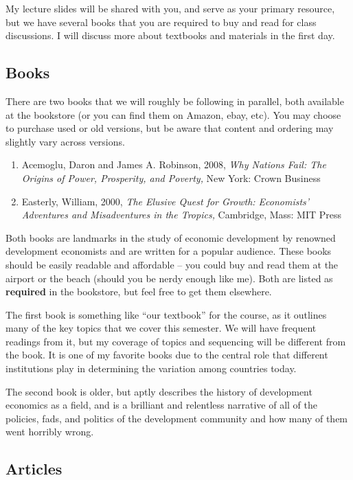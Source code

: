 \documentclass{article}
\providecommand{\tightlist}{%
  \setlength{\itemsep}{0pt}\setlength{\parskip}{0pt}}
\begin{document}
My lecture slides will be shared with you, and serve as your primary
resource, but we have several books that you are required to buy and
read for class discussions. I will discuss more about textbooks and
materials in the first day.

\hypertarget{books}{%
\subsection{Books}\label{books}}

There are two books that we will roughly be following in parallel, both
available at the bookstore (or you can find them on Amazon, ebay, etc).
You may choose to purchase used or old versions, but be aware that
content and ordering may slightly vary across versions.

\begin{enumerate}
\def\labelenumi{\arabic{enumi}.}
\tightlist
\item
  Acemoglu, Daron and James A. Robinson, 2008, \emph{Why Nations Fail:
  The Origins of Power, Prosperity, and Poverty,} New York: Crown
  Business
\item
  Easterly, William, 2000, \emph{The Elusive Quest for Growth:
  Economists' Adventures and Misadventures in the Tropics,} Cambridge,
  Mass: MIT Press
\end{enumerate}

Both books are landmarks in the study of economic development by
renowned development economists and are written for a popular audience.
These books should be easily readable and affordable -- you could buy
and read them at the airport or the beach (should you be nerdy enough
like me). Both are listed as \textbf{required} in the bookstore, but
feel free to get them elsewhere.

The first book is something like ``our textbook'' for the course, as it
outlines many of the key topics that we cover this semester. We will
have frequent readings from it, but my coverage of topics and sequencing
will be different from the book. It is one of my favorite books due to
the central role that different institutions play in determining the
variation among countries today.

The second book is older, but aptly describes the history of development
economics as a field, and is a brilliant and relentless narrative of all
of the policies, fads, and politics of the development community and how
many of them went horribly wrong.

\hypertarget{articles}{%
\subsection{Articles}\label{articles}}
\end{document}
